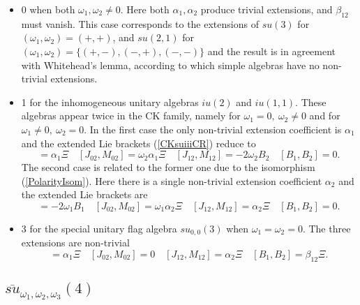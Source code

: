 \documentclass[12pt]{article}
\begin{document}
\begin{itemize}
\item
0 when both ${\omega}_1,{\omega}_2\ne 0$. Here both
${\alpha}_{1}, {\alpha}_{2}$ produce trivial extensions, and ${\beta}_{12}$
must vanish. This case corresponds to the extensions of ${su}(3)$ for
$({\omega}_1,{\omega}_2)=(+,+)$,  and  ${su}({2,1})$ for
$({\omega}_1,{\omega}_2)=\{(+,-),(-,+),(-,-)\}$ and the result is in agreement
with Whitehead's lemma, according to which simple algebras have no
non-trivial extensions.

\item
1 for the inhomogeneous unitary algebras ${iu}(2)$ and
${iu}({1,1})$. These algebras appear twice in the CK family, namely
for ${\omega}_1= 0,\ {\omega}_2 \neq 0$ and for ${\omega}_1\neq 0,\ {\omega}_2=0$. In the
first case the only non-trivial extension coefficient is
${\alpha}_{1}$ and the extended Lie brackets (\ref{CKsuiiiCR}) reduce to
\begin{equation}
 [{J}_{01},{M}_{01}] = {\alpha}_{1}\Xi  \quad
 [{J}_{02},{M}_{02}] ={\omega}_2  {\alpha}_{1}\Xi     \quad
 [{J}_{12},{M}_{12}] =-2{\omega}_2{B}_2  \quad [{B}_1,{B}_2]=0.
\label{qc}
\end{equation}
The second case  is related to the former one due to the isomorphism
(\ref{PolarityIsom}). Here there is a single non-trivial extension
coefficient ${\alpha}_{2}$ and the extended Lie brackets are
\begin{equation}
[{J}_{01},{M}_{01}] =-2{\omega}_1{B}_1  \quad
[{J}_{02},{M}_{02}] ={\omega}_1  {\alpha}_{2}\Xi   \quad
[{J}_{12},{M}_{12}] = {\alpha}_{2}\Xi  \quad
[{B}_1,{B}_2]=0.
\label{qd}
\end{equation}

\item
3 for the special unitary flag algebra ${su}_{0,0}(3)$
when ${\omega}_1={\omega}_2= 0$. The three extensions are  non-trivial
\begin{equation}
[{J}_{01},{M}_{01}] ={\alpha}_{1}\Xi  \quad
[{J}_{02},{M}_{02}] =0  \quad
[{J}_{12},{M}_{12}] = {\alpha}_{2}\Xi  \quad
[{B}_1,{B}_2]={\beta}_{12}\Xi.
\label{qe}
\end{equation}
\end{itemize}

\subsection{$\overline{su}_{{\omega}_1,{\omega}_2, {\omega}_3}(4)$ }
\end{document}
